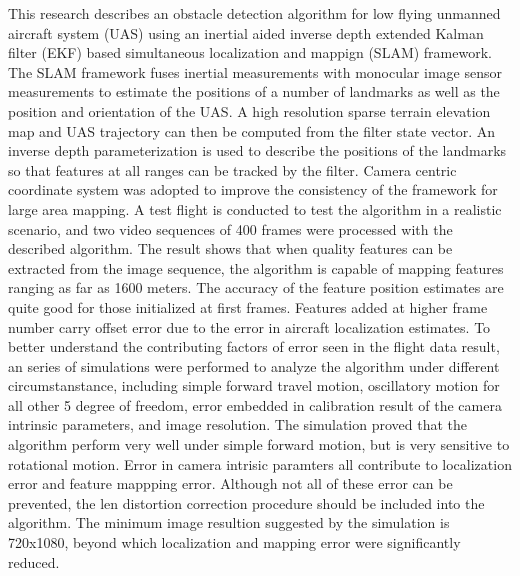 This research describes an obstacle detection algorithm for low flying
unmanned aircraft system (UAS) using an inertial aided inverse depth
extended Kalman filter (EKF) based simultaneous localization and
mappign (SLAM) framework. The SLAM framework fuses inertial
measurements with monocular image sensor measurements to estimate the
positions of a number of landmarks as well as the position and
orientation of the UAS. A high resolution sparse terrain elevation map
and UAS trajectory can then be computed from the filter state vector.
An inverse depth parameterization is used to describe the positions of
the landmarks so that features at all ranges can be tracked by the
filter. Camera centric coordinate system was adopted to improve the
consistency of the framework for large area mapping. A test flight is
conducted to test the algorithm in a realistic scenario, and two video
sequences of 400 frames were processed with the described algorithm.
The result shows that when quality features can be extracted from the
image sequence, the algorithm is capable of mapping features ranging
as far as 1600 meters. The accuracy of the feature position estimates
are quite good for those initialized at first frames. Features added
at higher frame number carry offset error due to the error in aircraft
localization estimates. To better understand the contributing factors
of error seen in the flight data result, an series of simulations were
performed to analyze the algorithm under different circumstanstance,
including simple forward travel motion, oscillatory motion for all
other 5 degree of freedom, error embedded in calibration result of the
camera intrinsic parameters, and image resolution. The simulation
proved that the algorithm perform very well under simple forward
motion, but is very sensitive to rotational motion. Error in camera
intrisic paramters all contribute to localization error and feature
mappping error. Although not all of these error can be prevented, the
len distortion correction procedure should be included into the
algorithm.  The minimum image resultion suggested by the
simulation is 720x1080, beyond which localization and mapping error
were significantly reduced. 

